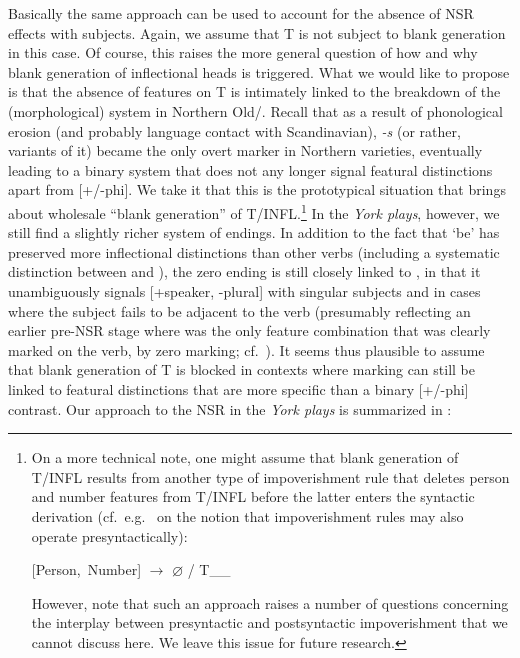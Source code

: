 \documentclass[output=paper]{langsci/langscibook}
\begin{document}
Basically the same approach can be used to account for the absence of \gls{NSR} effects with \Fsg{} subjects. Again, we assume that T is not subject to blank generation in this case. Of course, this raises the more general question of how and why blank generation of inflectional heads is triggered.
What we would like to propose is that the absence of  features on T is
intimately linked to the breakdown of the (morphological)  system in
Northern Old\slash{}. Recall that as a result of phonological
erosion (and probably language contact with Scandinavian), \emph{-s} (or
rather, variants of it) became the only overt  marker in Northern
varieties, eventually leading to a binary  system that does not any
longer signal featural distinctions apart from \mbox{[+/-phi]}. We take it  that this
is the prototypical situation that brings about wholesale ``blank generation''
of T/INFL.\footnote{On a more technical note, one might assume that blank
    generation of T/INFL results from another type of impoverishment rule that
    deletes person and number features from T/INFL before the latter enters the
    syntactic derivation (cf.\ e.g.\ \citealt{Mueller:2006} on the notion that
    impoverishment rules may also operate presyntactically):

    \begin{exe}
         \mbox{[Person, Number]} {$\rightarrow$ $\varnothing$} / T\_\_\
    \end{exe}

    However, note that such an approach raises a number of questions concerning the
    interplay between presyntactic and postsyntactic impoverishment that we cannot
    discuss here. We leave this issue for future research.} In the \emph{York
plays}, however, we still find a slightly richer system of endings. In addition
to the fact that `be' has preserved more inflectional distinctions than other
verbs (including a systematic distinction between \Ssg{} and \Spl{}), the zero
ending is still closely linked to \Fsg{}, in that it unambiguously signals
[+speaker, -plural] with singular subjects and in cases where the subject fails
to be adjacent to the verb (presumably reflecting an earlier pre-\gls{NSR}
stage where \Fsg{} was the only feature combination that was clearly marked on
the verb, by zero marking; cf.\ \Cref{tab:trips:10.2}). It seems thus plausible to
assume that blank generation of T is blocked in contexts where \isi{agreement}
marking can still be linked to featural distinctions that are more specific
than a binary [+/-phi] contrast. Our approach to the \gls{NSR} in the
\emph{York plays} is summarized in \REF{ex:10:29}:
\end{document}
